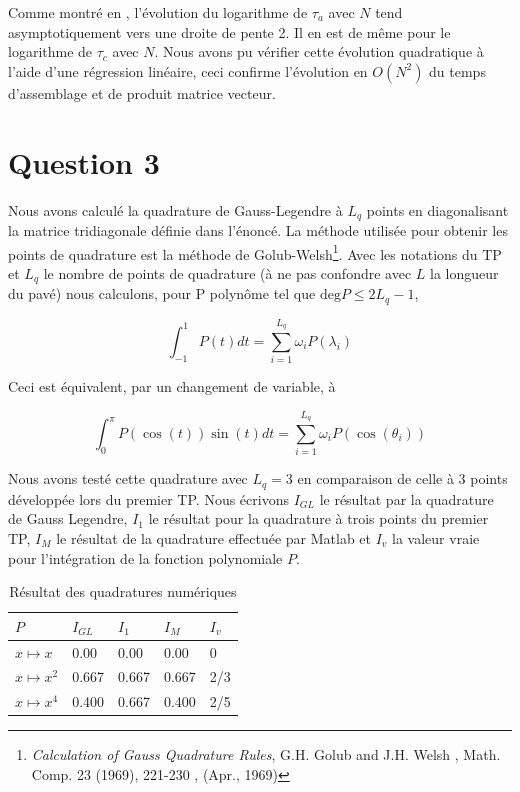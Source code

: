 \documentclass[10pt]{article}
\begin{document}
\begin{multicols}{2}
Comme montré en , l'évolution du logarithme de $\tau_a$ avec $N$ tend asymptotiquement vers une droite de pente 2. Il en est de même pour le logarithme de $\tau_c$ avec $N$. Nous avons pu vérifier cette évolution quadratique à l'aide d'une régression linéaire, ceci confirme l'évolution en $O(N^{2})$ du temps d'assemblage et de produit matrice vecteur.







\vspace*{22pt}

\section*{Question 3}

Nous avons calculé la quadrature de Gauss-Legendre à $L_q$ points en diagonalisant la matrice tridiagonale définie dans l'énoncé. La méthode utilisée pour obtenir les points de quadrature est la méthode de Golub-Welsh\footnote{\textit{Calculation of Gauss Quadrature Rules}, G.H. Golub and J.H. Welsh \color{cyan}, Math. Comp. 23 (1969), 221-230 \color{black}, (Apr., 1969)}. Avec les notations du TP et $L_q$ le nombre de points de quadrature (à ne pas confondre avec $L$ la longueur du pavé) nous calculons, pour P polynôme tel que $\text{deg}P \le 2L_q-1$,

\begin{equation}
	\int_{-1}^{1}{P(t)dt} = \sum_{i=1}^{L_q}{\omega_i P(\lambda_i)}
\end{equation}

Ceci est équivalent, par un changement de variable, à

\begin{equation}
	\int_{0}^{\pi}{P(\cos(t))\sin(t)dt} = \sum_{i=1}^{L_q}{\omega_i P(\cos(\theta_i))}
\end{equation}

Nous avons testé cette quadrature avec $L_q = 3$ en comparaison de celle à 3 points développée lors du premier TP. Nous écrivons $I_{GL}$ le résultat par la quadrature de Gauss Legendre, $I_{1}$ le résultat pour la quadrature à trois points du premier TP, $I_{M}$ le résultat de la quadrature effectuée par Matlab et $I_v$ la valeur vraie pour l’intégration de la fonction polynomiale $P$.

\begin{table}[H]
\centering
\begin{tabular}{m{2cm} |m{1cm} m{1cm} m{1cm} m{1cm}} 
   \hline
    \centering $P$ & $I_{GL}$ & $I_{1}$ & $I_{M}$ & $I_v$ \\
    \toprule
    \toprule
    $x \mapsto x$      & 0.00 & 0.00 & 0.00 & 0 \\
    $x \mapsto x^{2}$  & 0.667 & 0.667 & 0.667 & 2/3 \\
    $x \mapsto x^{4}$  & 0.400 & 0.667 & 0.400 & 2/5 \\
    \hline
\end{tabular}
\caption{Résultat des quadratures numériques}
\end{table}


\end{multicols}
\end{document}
